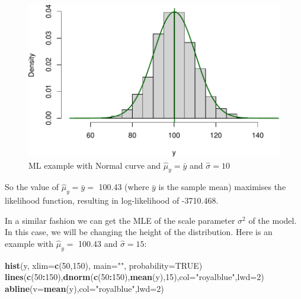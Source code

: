 \documentclass[
]{book}
\newenvironment{Shaded}{\begin{snugshade}}{\end{snugshade}}
\newcommand{\DataTypeTok}[1]{\textcolor[rgb]{0.13,0.29,0.53}{#1}}
\newcommand{\DecValTok}[1]{\textcolor[rgb]{0.00,0.00,0.81}{#1}}
\newcommand{\KeywordTok}[1]{\textcolor[rgb]{0.13,0.29,0.53}{\textbf{#1}}}
\newcommand{\NormalTok}[1]{#1}
\newcommand{\OperatorTok}[1]{\textcolor[rgb]{0.81,0.36,0.00}{\textbf{#1}}}
\newcommand{\OtherTok}[1]{\textcolor[rgb]{0.56,0.35,0.01}{#1}}
\newcommand{\StringTok}[1]{\textcolor[rgb]{0.31,0.60,0.02}{#1}}
\theoremstyle{definition}
\theoremstyle{definition}
\theoremstyle{definition}
\theoremstyle{definition}
\theoremstyle{remark}
\begin{document}
\begin{figure}
\centering
\includegraphics{Svetunkov---Statistics-for-Business-Analytics_files/figure-latex/MLENormalExample04-1.pdf}
\caption{\label{fig:MLENormalExample04}ML example with Normal curve and \(\hat{\mu}_y=\bar{y}\) and \(\hat{\sigma}=10\)}
\end{figure}

So the value of \(\hat{\mu}_y=\bar{y}=\) 100.43 (where \(\bar{y}\) is the sample mean) maximises the likelihood function, resulting in log-likelihood of -3710.468.

In a similar fashion we can get the MLE of the scale parameter \(\sigma^2\) of the model. In this case, we will be changing the height of the distribution. Here is an example with \(\hat{\mu}_y=\) 100.43 and \(\hat{\sigma}=15\):

\begin{Shaded}
\begin{Highlighting}[]
\KeywordTok{hist}\NormalTok{(y, }\DataTypeTok{xlim=}\KeywordTok{c}\NormalTok{(}\DecValTok{50}\NormalTok{,}\DecValTok{150}\NormalTok{), }\DataTypeTok{main=}\StringTok{""}\NormalTok{, }\DataTypeTok{probability=}\OtherTok{TRUE}\NormalTok{)}
\KeywordTok{lines}\NormalTok{(}\KeywordTok{c}\NormalTok{(}\DecValTok{50}\OperatorTok{:}\DecValTok{150}\NormalTok{),}\KeywordTok{dnorm}\NormalTok{(}\KeywordTok{c}\NormalTok{(}\DecValTok{50}\OperatorTok{:}\DecValTok{150}\NormalTok{),}\KeywordTok{mean}\NormalTok{(y),}\DecValTok{15}\NormalTok{),}\DataTypeTok{col=}\StringTok{"royalblue"}\NormalTok{,}\DataTypeTok{lwd=}\DecValTok{2}\NormalTok{)}
\KeywordTok{abline}\NormalTok{(}\DataTypeTok{v=}\KeywordTok{mean}\NormalTok{(y),}\DataTypeTok{col=}\StringTok{"royalblue"}\NormalTok{,}\DataTypeTok{lwd=}\DecValTok{2}\NormalTok{)}
\end{Highlighting}
\end{Shaded}
\end{document}
